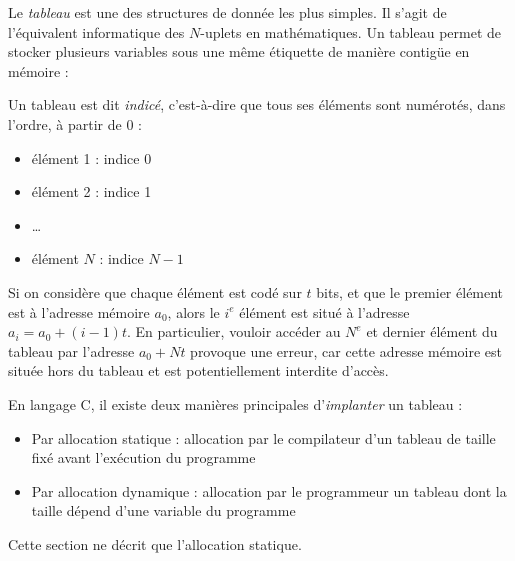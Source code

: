 \documentclass[../../../main.tex]{subfiles}
\begin{document}
 
Le \textit{tableau} est une des structures de donnée les plus simples. Il s'agit de l'équivalent informatique des $N$-uplets en mathématiques. Un tableau permet de stocker plusieurs variables sous une même étiquette de manière contigüe en mémoire : 

\begin{minipage}{\textwidth}
	\begin{center}
		
	\end{center}
\end{minipage} 

Un tableau est dit \textit{indicé}, c'est-à-dire que tous ses éléments sont numérotés, dans l'ordre, à partir de 0 :
\begin{itemize}
	\item élément 1 : indice 0
	\item élément 2 : indice 1
	\item \dots
	\item élément $N$ : indice $N - 1$
\end{itemize}
Si on considère que chaque élément est codé sur $t$ bits, et que le premier élément est à l'adresse mémoire $a_{0}$, alors le $i^e$ élément est situé à l'adresse $a_{i} = a_{0} + (i - 1)t$. En particulier, vouloir accéder au $N^e$ et dernier élément du tableau par l'adresse $a_{0} + Nt$ provoque une erreur, car cette adresse mémoire est située hors du tableau et est potentiellement interdite d'accès.
 
\begin{minipage}{\textwidth}
	\begin{center}
		
	\end{center}
\end{minipage}
 
En langage C, il existe deux manières principales d'\textit{implanter} un tableau :
\begin{itemize}
	\item Par allocation statique : allocation par le compilateur d'un tableau de taille fixé avant l'exécution du programme
	\item Par allocation dynamique : allocation par le programmeur un tableau dont la taille dépend d'une variable du programme
\end{itemize}
Cette section ne décrit que l'allocation statique.
\end{document}
